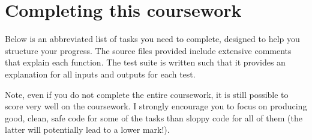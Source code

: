 \documentclass[a4paper]{article}
\begin{document}
%
%
%
%



\section*{Completing this coursework}\label{sec:tasks}

Below is an abbreviated list of tasks you need to complete, designed to help you structure your progress. The source files provided include extensive comments that explain each function. The test suite is written such that it provides an explanation for all inputs and outputs for each test.

Note, even if you do not complete the entire coursework, it is still possible to score very well on the coursework. I strongly encourage you to focus on producing good, clean, safe code for some of the tasks than sloppy code for all of them (the latter will potentially lead to a lower mark!).
\end{document}
